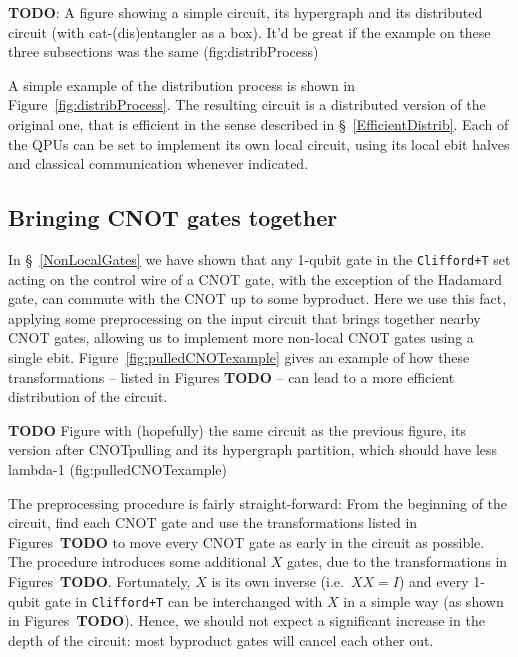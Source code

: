 \textbf{TODO}: A figure showing a simple circuit, its hypergraph and its distributed circuit (with cat-(dis)entangler as a box). It'd be great if the example on these three subsections was the same (fig:distribProcess)

A simple example of the distribution process is shown in Figure~\ref{fig:distribProcess}. The resulting circuit is a distributed version of the original one, that is efficient in the sense described in \S~\ref{EfficientDistrib}. Each of the QPUs can be set to implement its own local circuit, using its local ebit halves and classical communication whenever indicated.


\subsection{Bringing CNOT gates together}
\label{pullCNOTs}

In \S~\ref{NonLocalGates} we have shown that any 1-qubit gate in the \texttt{Clifford+T} set acting on the control wire of a CNOT gate, with the exception of the Hadamard gate, can commute with the CNOT up to some byproduct. Here we use this fact, applying some preprocessing on the input circuit that brings together nearby CNOT gates, allowing us to implement more non-local CNOT gates using a single ebit. Figure~\ref{fig:pulledCNOTexample} gives an example of how these transformations -- listed in Figures \textbf{TODO} -- can lead to a more efficient distribution of the circuit.

\textbf{TODO} Figure with (hopefully) the same circuit as the previous figure, its version after CNOTpulling and its hypergraph partition, which should have less lambda-1 (fig:pulledCNOTexample)

The preprocessing procedure is fairly straight-forward: From the beginning of the circuit, find each CNOT gate and use the transformations listed in Figures~\textbf{TODO} to move every CNOT gate as early in the circuit as possible. The procedure introduces some additional \(X\) gates, due to the transformations in Figures~\textbf{TODO}. Fortunately, \(X\) is its own inverse (i.e.\ \(XX = I\)) and every 1-qubit gate in \texttt{Clifford+T} can be interchanged with \(X\) in a simple way (as shown in Figures~\textbf{TODO}). Hence, we should not expect a significant increase in the depth of the circuit: most byproduct gates will cancel each other out.

